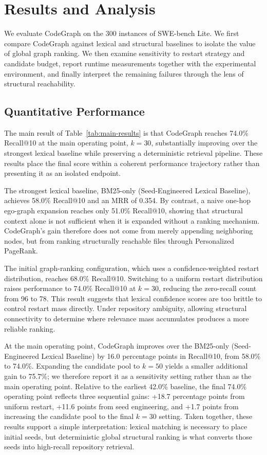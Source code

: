 \section{Results and Analysis}
\label{sec:results}

We evaluate CodeGraph on the 300 instances of SWE-bench Lite. We first compare CodeGraph against lexical and structural baselines to isolate the value of global graph ranking. We then examine sensitivity to restart strategy and candidate budget, report runtime measurements together with the experimental environment, and finally interpret the remaining failures through the lens of structural reachability.

\subsection{Quantitative Performance}

The main result of Table~\ref{tab:main-results} is that CodeGraph reaches 74.0\% Recall@10 at the main operating point, $k=30$, substantially improving over the strongest lexical baseline while preserving a deterministic retrieval pipeline. These results place the final score within a coherent performance trajectory rather than presenting it as an isolated endpoint.

The strongest lexical baseline, BM25-only (Seed-Engineered Lexical Baseline), achieves 58.0\% Recall@10 and an MRR of 0.354. By contrast, a naive one-hop ego-graph expansion reaches only 51.0\% Recall@10, showing that structural context alone is not sufficient when it is expanded without a ranking mechanism. CodeGraph’s gain therefore does not come from merely appending neighboring nodes, but from ranking structurally reachable files through Personalized PageRank.

The initial graph-ranking configuration, which uses a confidence-weighted restart distribution, reaches 68.0\% Recall@10. Switching to a uniform restart distribution raises performance to 74.0\% Recall@10 at $k=30$, reducing the zero-recall count from 96 to 78. This result suggests that lexical confidence scores are too brittle to control restart mass directly. Under repository ambiguity, allowing structural connectivity to determine where relevance mass accumulates produces a more reliable ranking.

At the main operating point, CodeGraph improves over the BM25-only (Seed-Engineered Lexical Baseline) by 16.0 percentage points in Recall@10, from 58.0\% to 74.0\%. Expanding the candidate pool to $k=50$ yields a smaller additional gain to 75.7\%; we therefore report it as a sensitivity setting rather than as the main operating point. Relative to the earliest 42.0\% baseline, the final 74.0\% operating point reflects three sequential gains: +18.7 percentage points from uniform restart, +11.6 points from seed engineering, and +1.7 points from increasing the candidate pool to the final $k=30$ setting. Taken together, these results support a simple interpretation: lexical matching is necessary to place initial seeds, but deterministic global structural ranking is what converts those seeds into high-recall repository retrieval.

